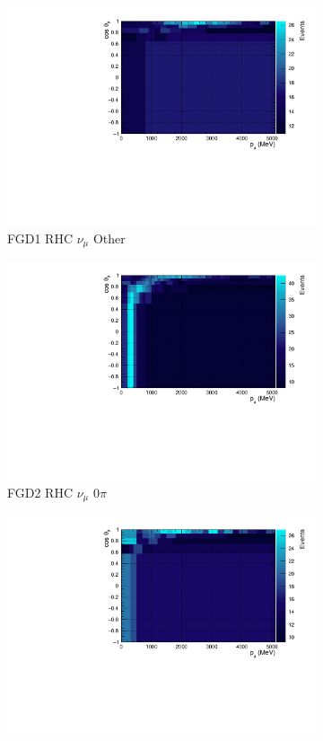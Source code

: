 \begin{figure}[!htbp]
\begin{subfigure}{.32\textwidth}
  \includegraphics[width=0.95\linewidth]{figs/TH2PolyNom_MC_FGD1_NuMuBkg_CCOther_in_AntiNu_Mode}
  \caption{FGD1 RHC $\nu_{\mu}$ Other}
  \label{fig:th2polynomFGD1_NuMuBkg_CCOther_in_AntiNu_Mode}
\end{subfigure}
\begin{subfigure}{.32\textwidth}
  \centering
  \includegraphics[width=0.95\linewidth]{figs/TH2PolyNom_MC_FGD2_NuMuBkg_CC0pi_in_AntiNu_Mode}
  \caption{FGD2 RHC $\nu_{\mu}$ 0$\pi$}
  \label{fig:th2polynomFGD2_NuMuBkg_CC0pi_in_AntiNu_Mode}
\end{subfigure}
\begin{subfigure}{.32\textwidth}
  \centering
  \includegraphics[width=0.95\linewidth]{figs/TH2PolyNom_MC_FGD2_NuMuBkg_CC1pi_in_AntiNu_Mode}

\end{subfigure}
\end{figure}
